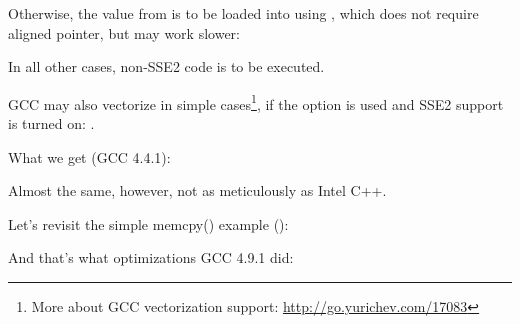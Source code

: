 Otherwise, the value from  is to be loaded into  using \MOVDQU,
which does not require aligned pointer, but may work slower:



In all other cases, non-SSE2 code is to be executed.


\newcommand{\URLGCCVEC}{\url{http://go.yurichev.com/17083}}

GCC may also vectorize in simple cases\footnote{More about GCC vectorization support: \URLGCCVEC},
if the \Othree option is used and SSE2 support is turned on: .

What we get (GCC 4.4.1):



Almost the same, however, not as meticulously as Intel C++.

\label{vec_memcpy}

Let's revisit the simple memcpy() example
():



And that's what optimizations GCC 4.9.1 did:


